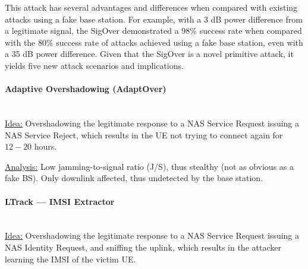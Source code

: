 This attack has several advantages and differences when compared with existing
attacks using a fake base station. For example, with a 3 dB power difference
from a legitimate signal, the SigOver demonstrated a 98\% success rate when
compared with the 80\% success rate of attacks achieved using a fake base
station, even with a 35 dB power difference. Given that the SigOver is a novel
primitive attack, it yields five new attack scenarios and implications.

\paragraph{Adaptive Overshadowing (AdaptOver)} \mbox{} \\
\underline{Idea:}
Overshadowing the legitimate response to a NAS Service Request issuing a NAS Service Reject, which results in the UE not trying to connect again for $12-20$ hours.

\underline{Analysis:}
Low jamming-to-signal ratio (J/S), thus stealthy (not as obvious as a fake BS).
Only downlink affected, thus undetected by the base station.

\paragraph{LTrack --- IMSI Extractor} \mbox{} \\
\underline{Idea:}
Overshadowing the legitimate response to a NAS Service Request issuing a NAS Identity Request, and sniffing the uplink, which results in the attacker learning the IMSI of the victim UE.

